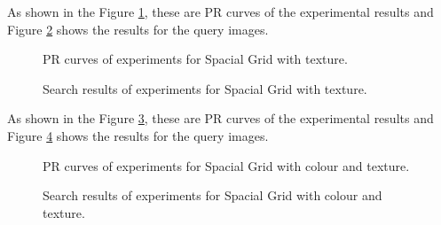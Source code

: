 \documentclass{article}
\begin{document}
As shown in the Figure \ref{fig:spacialGridtexturePR}, these are PR curves of the experimental results and Figure \ref{fig:spacialGridtextureResult} shows the results for the query images.

\begin{figure}[!tbp]
  \centering
  \hfill
  \hfill
  \caption{\label{fig:spacialGridtexturePR} PR curves of experiments for Spacial Grid with texture.}
\end{figure}

\begin{figure}[!tbp]
  \centering
  \hfill
  \hfill
  \caption{\label{fig:spacialGridtextureResult} Search results of experiments for Spacial Grid with texture.}
\end{figure}


As shown in the Figure \ref{fig:spacialGridbothPR}, these are PR curves of the experimental results and Figure \ref{fig:spacialGridbothResult} shows the results for the query images.

\begin{figure}[!tbp]
  \centering
  \hfill
  \hfill
  \caption{\label{fig:spacialGridbothPR} PR curves of experiments for Spacial Grid with colour and texture.}
\end{figure}

\begin{figure}[!tbp]
  \centering
  \hfill
  \hfill
  \caption{\label{fig:spacialGridbothResult} Search results of experiments for Spacial Grid with colour and texture.}
\end{figure}
\end{document}
